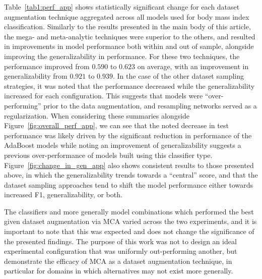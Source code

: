 \documentclass[10pt]{SelfArx} %
\begin{document}
{Table~\ref{tab1:perf_app} shows statistically significant change for each dataset augmentation technique aggregated
across all models used for body mass index classification. Similarly to the results presented in the main body of this
article, the mega- and meta-analytic techniques were superior to the others, and resulted in improvements in model
performance both within and out of sample, alongside improving the generalizability in performance. For these two
techniques, the performance improved from $0.590$ to $0.623$ on average, with an improvement in generalizability from
$0.921$ to $0.939$. In the case of the other dataset sampling strategies, it was noted that the performance decreased
while the generalizability increased for each configuration. This suggests that models were ``over-performing'' prior
to the data augmentation, and resampling networks served as a regularization. When considering these summaries
alongside Figure~\ref{fig:overall_perf_app}, we can see that the noted decrease in test performance was likely driven
by the significant reduction in performance of the AdaBoost models while noting an improvement of generalizability
suggests a previous over-performance of models built using this classifier type. Figure~\ref{fig:change_in_gen_app}
also shows consistent results to those presented above, in which the generalizability trends towards a ``central''
score, and that the dataset sampling approaches tend to shift the model performance either towards increased F1,
generalizability, or both.

The classifiers and more generally model combinations which performed the best given dataset augmentation via MCA
varied across the two experiments, and it is important to note that this was expected and does not change the
significance of the presented findings. The purpose of this work was not to design an ideal experimental configuration
that was uniformly out-performing another, but demonstrate the efficacy of MCA as a dataset augmentation technique,
in particular for domains in which alternatives may not exist more generally.
}
\end{document}
